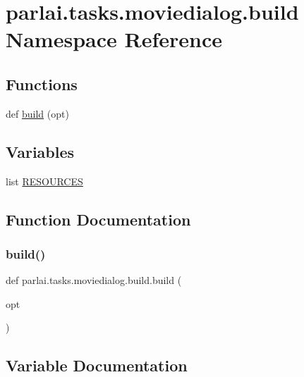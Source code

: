 \hypertarget{namespaceparlai_1_1tasks_1_1moviedialog_1_1build}{}\section{parlai.\+tasks.\+moviedialog.\+build Namespace Reference}
\label{namespaceparlai_1_1tasks_1_1moviedialog_1_1build}
\subsection*{Functions}
\begin{DoxyCompactItemize}
\item 
def \hyperlink{namespaceparlai_1_1tasks_1_1moviedialog_1_1build_a844c68eb87eb666ec20f2b507813469a}{build} (opt)
\end{DoxyCompactItemize}
\subsection*{Variables}
\begin{DoxyCompactItemize}
\item 
list \hyperlink{namespaceparlai_1_1tasks_1_1moviedialog_1_1build_a404693b6776a41f21330570a44878ddd}{R\+E\+S\+O\+U\+R\+C\+ES}
\end{DoxyCompactItemize}


\subsection{Function Documentation}
\mbox{\label{namespaceparlai_1_1tasks_1_1moviedialog_1_1build_a844c68eb87eb666ec20f2b507813469a}} 
\subsubsection{\texorpdfstring{build()}{build()}}
{\footnotesize\ttfamily def parlai.\+tasks.\+moviedialog.\+build.\+build (\begin{DoxyParamCaption}\item[{}]{opt }\end{DoxyParamCaption})}



\subsection{Variable Documentation}
\mbox{\label{namespaceparlai_1_1tasks_1_1moviedialog_1_1build_a404693b6776a41f21330570a44878ddd}} 
